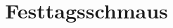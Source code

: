 \documentclass[open=left]{Ilaris}
\title{Festtagsschmaus}
\begin{document}
	\hauptteil
%		
%		
%	
%
%
%
%	
%	
%
%	
%
%	
%	
%	
%
%		
\end{document}
